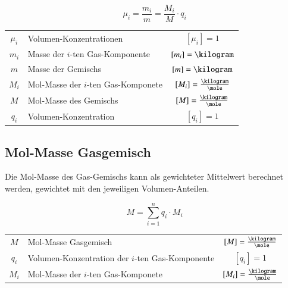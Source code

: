 $$ \boxed{ \mu_i = \frac{m_i}{m} = \frac{M_i}{M} \cdot q_i } $$

\renewcommand{\arraystretch}{1.3}
\begin{tabular}{c l c}
	$\mu_i$ & Volumen-Konzentrationen 				& $[\mu_i] = 1$ 					\\
	$m_i$ 	& Masse der $i$-ten Gas-Komponente 		& $[m_i] = \kilogram$ 				\\
	$m$ 	& Masse der Gemischs 					& $[m] = \kilogram$ 				\\
	$M_i$ 	& Mol-Masse der $i$-ten Gas-Komponete 	& $[M_i] = \frac{\kilogram}{\mole}$ \\
	$M$ 	& Mol-Masse des Gemischs 				& $[M] = \frac{\kilogram}{\mole}$ 	\\
	$q_i$ 	& Volumen-Konzentration					& $[q_i] = 1$
\end{tabular}
\renewcommand{\arraystretch}{1}


\subsection{Mol-Masse Gasgemisch}

Die Mol-Masse des Gas-Gemischs kann als gewichteter Mittelwert berechnet werden, gewichtet mit den jeweiligen Volumen-Anteilen.

$$ \boxed{ M = \sum_{i=1}^n  q_i \cdot M_i } $$

\renewcommand{\arraystretch}{1.3}
\begin{tabular}{c l c}
	$M$ 	& Mol-Masse Gasgemisch								& $[M] = \frac{\kilogram}{\mole}$ 	\\
	$q_i$ 	& Volumen-Konzentration der $i$-ten Gas-Komponente	& $[q_i] = 1$ 						\\
	$M_i$ 	& Mol-Masse der $i$-ten Gas-Komponete 				& $[M_i] = \frac{\kilogram}{\mole}$
\end{tabular}
\renewcommand{\arraystretch}{1}

